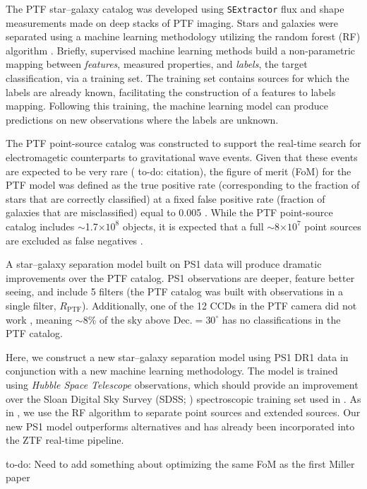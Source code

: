 \documentclass[twocolumn]{aastex62}
\newcommand{\todo}[1]{{\color{magenta} to-do: {#1}}}
\begin{document}
The PTF star--galaxy catalog was developed using \texttt{SExtractor}
\citep{bertin96} flux and shape measurements made on deep stacks of PTF
imaging. Stars and galaxies were separated using a machine learning
methodology utilizing the random forest (RF) algorithm \citep{Breiman01}.
Briefly, supervised machine learning methods build a non-parametric mapping
between \textit{features}, measured properties, and \textit{labels}, the
target classification, via a training set. The training set contains sources
for which the labels are already known, facilitating the construction of a
features to labels mapping. Following this training, the machine learning
model can produce predictions on new observations where the labels are
unknown.

The PTF point-source catalog was constructed to support the real-time search
for electromagetic counterparts to gravitational wave events. Given that
these events are expected to be very rare (\todo{citation}), the figure of
merit (FoM) for the PTF model was defined as the true positive rate
(corresponding to the fraction of stars that are correctly classified) at a
fixed false positive rate (fraction of galaxies that are misclassified) equal
to 0.005 \citep{Miller17}. While the PTF point-source catalog includes
$\sim$1.7$\times 10^8$ objects, it is expected that a full
$\sim$8$\times10^7$ point sources are excluded as false negatives
\citep{Miller17}.

A star--galaxy separation model built on PS1 data will produce dramatic
improvements over the PTF catalog. PS1 observations are deeper, feature
better seeing, and include 5 filters (the PTF catalog was built with
observations in a single filter, $R_\mathrm{PTF}$). Additionally, one of the
12 CCDs in the PTF camera did not work \citep{Law09}, meaning $\sim$8\% of
the sky above $\mathrm{Dec.} = 30^\circ$ has no classifications in the PTF
catalog.

Here, we construct a new star--galaxy separation model using PS1 DR1 data in
conjunction with a new machine learning methodology. The model is trained
using \textit{Hubble Space Telescope} observations, which should provide an
improvement over the Sloan Digital Sky Survey (SDSS; \citealt{York00})
spectroscopic training set used in \citet{Miller17}. As in \citet{Miller17},
we use the RF algorithm to separate point sources and extended sources. Our
new PS1 model outperforms alternatives and has already been incorporated into
the ZTF real-time pipeline.

\todo{Need to add something about optimizing the same FoM as the first Miller paper}
\end{document}
